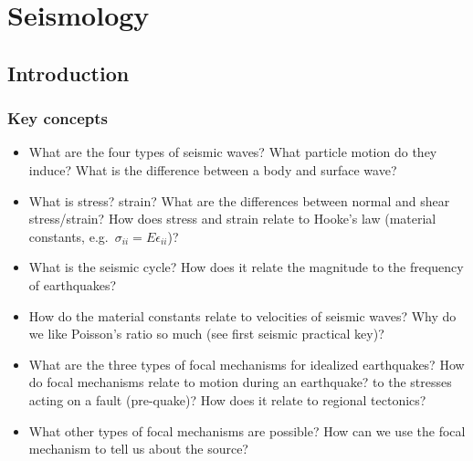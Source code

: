 \chapter{Seismology}\label{ch:seismology}
\section{Introduction}
\subsection{Key concepts}
\begin{itemize}
    \item What are the four types of seismic waves?  What particle motion do
    they induce?  What is the difference between a body and surface wave?

    \item What is stress? strain?  What are the differences between normal and
    shear stress/strain?  How does stress and strain relate to Hooke's law
    (material constants, e.g.\ $\sigma_{ii} = E \epsilon_{ii}$)?

    \item What is the seismic cycle?  How does it relate the magnitude to the
        frequency of earthquakes?

    \item How do the material constants relate to velocities of seismic waves?
    Why do we like Poisson's ratio so much (see first seismic practical key)?

    \item What are the three types of focal mechanisms for idealized
    earthquakes?  How do focal mechanisms relate to motion during an earthquake?
    to the stresses acting on a fault (pre-quake)?  How does it relate to
    regional tectonics?

    \item What other types of focal mechanisms are possible?  How can we use the
    focal mechanism to tell us about the source?

\end{itemize}

